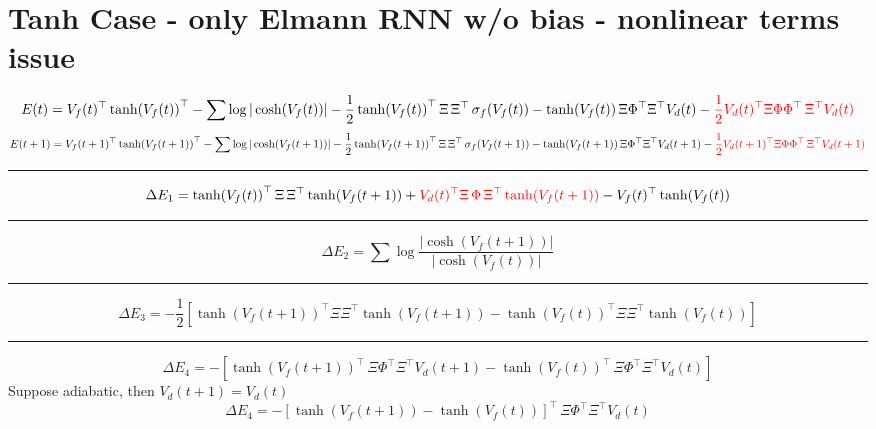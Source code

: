 \documentclass[11pt]{article}
\theoremstyle{definition}
\begin{document}
\section{Tanh Case - only Elmann RNN w/o bias - nonlinear terms issue}
%
\begin{dmath}
	E(t) = V_f(t)^\top \tanh(V_f(t))^\top - \sum \log |\cosh(V_f(t))| - \frac{1}{2} \tanh(V_f(t))^\top \, \Xi \, \Xi^\top \, \sigma_f(V_f(t)) - \tanh(V_f(t)) \, \Xi \Phi^\top \Xi^\top V_d(t) - \textcolor{red}{\frac{1}{2} V_d(t)^\top \Xi \Phi \Phi^\top \, \Xi^\top V_{d}(t)}
\end{dmath}
%
\begin{dmath}
	E(t+1) = V_f(t+1)^\top \tanh(V_f(t+1))^\top - \sum \log |\cosh(V_f(t+1))| - \frac{1}{2} \tanh(V_f(t+1))^\top \, \Xi \, \Xi^\top \, \sigma_f(V_f(t+1)) - \tanh(V_f(t+1)) \, \Xi \Phi^\top \Xi^\top V_d(t+1) - \textcolor{red}{\frac{1}{2} V_d(t+1)^\top \Xi \Phi \Phi^\top \, \Xi^\top V_{d}(t+1)}
\end{dmath}
%
\noindent\rule{8cm}{0.4pt} %
%
\begin{dmath}
	\Delta E_1 = \tanh(V_f(t))^\top \, \Xi \, \Xi^\top \tanh(V_f(t+1)) + \textcolor{red}{V_{d}(t)^\top \Xi \, \Phi \, \Xi^\top \tanh(V_f(t+1))} - V_f(t)^\top \tanh(V_f(t)) 
\end{dmath}
%
\noindent\rule{8cm}{0.4pt} %
%
\begin{dmath}
	\Delta E_2 = \sum \log \frac{|\cosh(V_f(t+1))|}{|\cosh(V_f(t))|} 
\end{dmath}
%
\noindent\rule{8cm}{0.4pt} %
%
\begin{dmath}
	\Delta E_3 = - \frac{1}{2} \left[ \tanh(V_f(t+1))^\top \Xi \Xi^\top \tanh(V_f(t+1)) - \tanh(V_f(t))^\top \Xi \Xi^\top \tanh(V_f(t)) \right]
\end{dmath}
%
\noindent\rule{8cm}{0.4pt} %
%
\begin{dmath}
	\Delta E_4 = - \left[ \tanh(V_f(t+1))^\top \, \Xi \Phi^\top \Xi^\top V_d(t+1) - \tanh(V_f(t))^\top \, \Xi \Phi^\top \Xi^\top V_d(t) \right]
\end{dmath}
%
Suppose adiabatic, then $V_d(t+1) = V_d(t)$
%
\begin{dmath}
	\Delta E_4 = - \left[ \tanh(V_f(t+1)) - \tanh(V_f(t)) \right]^\top \, \Xi \Phi^\top \Xi^\top V_d(t)
\end{dmath}
\end{document}
